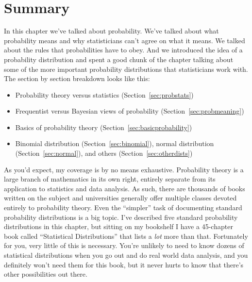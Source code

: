 \section{Summary}

In this chapter we've talked about probability. We've talked about what probability means and why statisticians can't agree on what it means. We talked about the rules that probabilities have to obey. And we introduced the idea of a probability distribution and spent a good chunk of the chapter talking about some of the more important probability distributions that statisticians work with. The section by section breakdown looks like this:

\begin{itemize} \itemsep -2pt
\item Probability theory versus statistics (Section~\ref{sec:probstats})
\item Frequentist versus Bayesian views of probability (Section~\ref{sec:probmeaning})
\item Basics of probability theory (Section~\ref{sec:basicprobability})
\item Binomial distribution (Section~\ref{sec:binomial}), normal distribution (Section~\ref{sec:normal}), and others (Section~\ref{sec:otherdists})
\end{itemize}

As you'd expect, my coverage is by no means exhaustive. Probability theory is a large branch of mathematics in its own right, entirely separate from its application to statistics and data analysis. As such, there are thousands of books written on the subject and universities generally offer multiple classes devoted entirely to probability theory. Even the ``simpler'' task of documenting standard probability distributions is a big topic. I've described five standard probability distributions in this chapter, but sitting on my bookshelf I have a 45-chapter book called ``Statistical Distributions'' \parencite{Evans2000} that lists a {\it lot} more than that. Fortunately for you, very little of this is necessary. You're unlikely to need to know dozens of statistical distributions when you go out and do real world data analysis, and you definitely won't need them for this book, but it never hurts to know that there's other possibilities out there.

